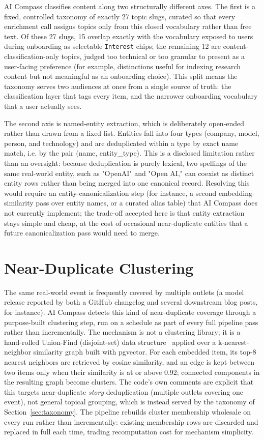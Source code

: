 AI Compass classifies content along two structurally different axes. The first is a fixed, controlled taxonomy of exactly 27 topic slugs, curated so that every enrichment call assigns topics only from this closed vocabulary rather than free text. Of these 27 slugs, 15 overlap exactly with the vocabulary exposed to users during onboarding as selectable \texttt{Interest} chips; the remaining 12 are content-classification-only topics, judged too technical or too granular to present as a user-facing preference (for example, distinctions useful for indexing research content but not meaningful as an onboarding choice). This split means the taxonomy serves two audiences at once from a single source of truth: the classification layer that tags every item, and the narrower onboarding vocabulary that a user actually sees.

The second axis is named-entity extraction, which is deliberately open-ended rather than drawn from a fixed list. Entities fall into four types (company, model, person, and technology) and are deduplicated within a type by exact name match, i.e. by the pair (name, entity\_type). This is a disclosed limitation rather than an oversight: because deduplication is purely lexical, two spellings of the same real-world entity, such as "OpenAI" and "Open AI," can coexist as distinct entity rows rather than being merged into one canonical record. Resolving this would require an entity-canonicalization step (for instance, a second embedding-similarity pass over entity names, or a curated alias table) that AI Compass does not currently implement; the trade-off accepted here is that entity extraction stays simple and cheap, at the cost of occasional near-duplicate entities that a future canonicalization pass would need to merge.

\section{Near-Duplicate Clustering}
\label{sec:clustering}

The same real-world event is frequently covered by multiple outlets (a model release reported by both a GitHub changelog and several downstream blog posts, for instance). AI Compass detects this kind of near-duplicate coverage through a purpose-built clustering step, run on a schedule as part of every full pipeline pass rather than incrementally. The mechanism is not a clustering library; it is a hand-rolled Union-Find (disjoint-set) data structure~\cite{tarjan1975unionfind} applied over a k-nearest-neighbor similarity graph built with pgvector. For each embedded item, its top-8 nearest neighbors are retrieved by cosine similarity, and an edge is kept between two items only when their similarity is at or above 0.92; connected components in the resulting graph become clusters. The code's own comments are explicit that this targets near-duplicate \emph{story} deduplication (multiple outlets covering one event), not general topical grouping, which is instead served by the taxonomy of Section~\ref{sec:taxonomy}. The pipeline rebuilds cluster membership wholesale on every run rather than incrementally: existing membership rows are discarded and replaced in full each time, trading recomputation cost for mechanism simplicity.

